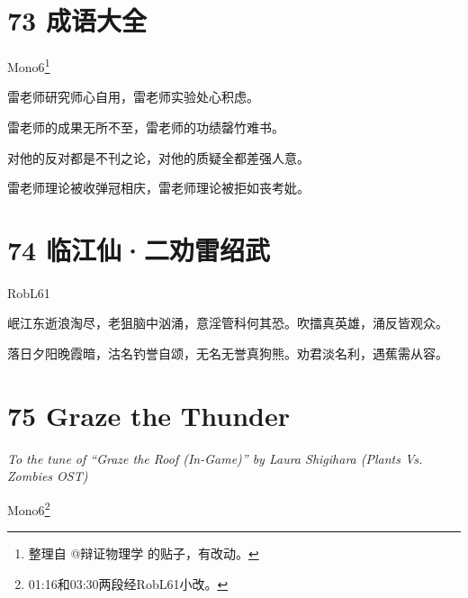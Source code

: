 \documentclass[UTF8,12pt,oneside]{ctexbook}
\begin{document}
        \section{73 成语大全}
        \begin{center}
            Mono6\footnote{整理自 @辩证物理学 的贴子，有改动。}
        \end{center}
        
        雷老师研究师心自用，雷老师实验处心积虑。
        
        雷老师的成果无所不至，雷老师的功绩罄竹难书。
        
        对他的反对都是不刊之论，对他的质疑全都差强人意。
        
        雷老师理论被收弹冠相庆，雷老师理论被拒如丧考妣。
        
        \section{74 临江仙·二劝雷绍武}
        \begin{center}
            RobL61
        \end{center}
        
        岷江东逝浪淘尽，老狙脑中汹涌，意淫管科何其恐。吹擂真英雄，涌反皆观众。
        
        落日夕阳晚霞暗，沽名钓誉自颂，无名无誉真狗熊。劝君淡名利，遇蕉需从容。
        
        \newpage
        
        \section{75 Graze the Thunder}
        \begin{center}
            \textit{To the tune of “Graze the Roof (In-Game)” by Laura Shigihara (Plants Vs. Zombies OST)}
            
            Mono6\footnote{01:16和03:30两段经RobL61小改。}
        \end{center}
        
\end{document}
